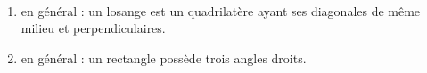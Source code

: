 \ \\ [-5mm]
\begin{enumerate}
   \item {} en général : un losange est un quadrilatère ayant ses diagonales de même milieu et perpendiculaires.
   \item {} en général : un rectangle possède trois angles droits.
\end{enumerate}
